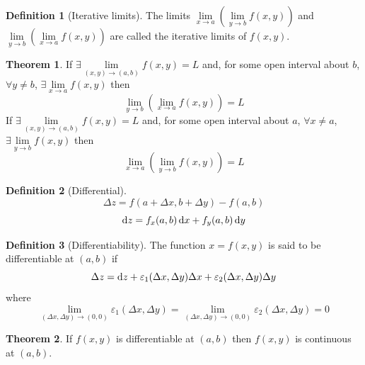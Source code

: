 \documentclass[fleqn, a4paper, 8pt, twoside]{amsart}
\theoremstyle{definition}
\theoremstyle{bluedefinition}
\newtheorem{definition}{Definition}
\theoremstyle{redtheorem}
\newtheorem{theorem}{Theorem}
\begin{document}
\begin{multicols}{2}
\begin{spacing}{0.7}
\begin{definition}[Iterative limits]
	The limits $\lim\limits_{x \to a} \left( \lim\limits_{y \to b} f(x,y) \right)$ and $\lim\limits_{y \to b} \left( \lim\limits_{x \to a} f(x,y) \right)$ are called the iterative limits of $f(x,y)$.
\end{definition}

\begin{theorem}
	If $\exists \lim\limits_{(x,y) \to (a,b)} f(x,y) = L$ and, for some open interval about $b$, $\forall y \neq b$, $\exists \lim\limits_{x \to a} f(x,y)$ then 
	\begin{equation*}
		\lim\limits_{y \to b} \left( \lim\limits_{x \to a} f(x,y) \right) = L
	\end{equation*}
	If $\exists \lim\limits_{(x,y) \to (a,b)} f(x,y) = L$ and, for some open interval about $a$, $\forall x \neq a$, $\exists \lim\limits_{y \to b} f(x,y)$ then 
	\begin{equation*}
		\lim\limits_{x \to a} \left( \lim\limits_{y \to b} f(x,y) \right) = L
	\end{equation*}
\end{theorem}

\begin{definition}[Differential]
	\begin{equation*}
		\Delta z = f(a + \Delta x, b + \Delta y) - f(a, b)
	\end{equation*}
	\begin{equation*}
		\dif z = f_x(a,b) \dif x + f_y(a,b) \dif y
	\end{equation*}
\end{definition}

\begin{definition}[Differentiability]
	The function $x = f(x,y)$ is said to be differentiable at $(a,b)$ if
	\begin{equation*}
		\Delta z = \dif z + \varepsilon_1(\Delta x, \Delta y) \Delta x + \varepsilon_2(\Delta x, \Delta y) \Delta y
	\end{equation*}
	where
	\begin{equation*}
		\lim\limits_{(\Delta x, \Delta y) \to (0,0)} \varepsilon_1(\Delta x, \Delta y) = \lim\limits_{(\Delta x, \Delta y) \to (0,0)} \varepsilon_2(\Delta x, \Delta y) = 0
	\end{equation*}
\end{definition}

\begin{theorem}
	If $f(x,y)$ is differentiable at $(a,b)$ then $f(x,y)$ is continuous at $(a,b)$.
\end{theorem}


\end{spacing}
\end{multicols}
\end{document}

